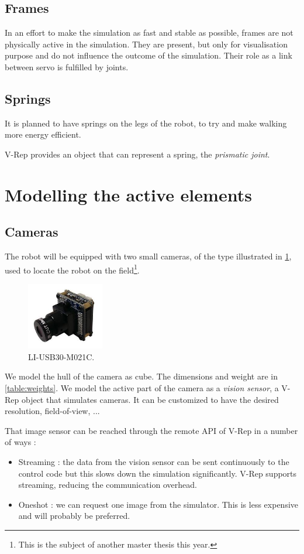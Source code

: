 \subsection{Frames}
In an effort to make the simulation as fast and stable as possible, frames are not physically active in the simulation. They are present, but only for visualisation purpose and do not influence the outcome of the simulation. Their role as a link between servo is fulfilled by joints.

\subsection{Springs}
It is planned to have springs on the legs of the robot, to try and make walking more energy efficient. 

V-Rep provides an object that can represent a spring, the \emph{prismatic joint}.

\section{Modelling the active elements}
\subsection{Cameras}
The robot will be equipped with two small cameras, of the type illustrated in \cref{fig:camera}, used to locate the robot on the field\footnote{This is the subject of another master thesis this year.}. 

\begin{figure}[htp]
\center
    \includegraphics[width = 0.3\textwidth]{figures/li_cam}
    \caption[LI-USB30-M021C]{LI-USB30-M021C.}
    \label{fig:camera}
\end{figure}

We model the hull of the camera as cube. The dimensions and weight are in \cref{table:weights}. We model the active part of the camera as a \emph{vision sensor}, a V-Rep object that simulates cameras. It can be customized to have the desired resolution, field-of-view, ...

That image sensor can be reached through the remote API of V-Rep in a number of ways : \begin{itemize}
\item Streaming : the data from the vision sensor can be sent continuously to the control code but this slows down the simulation significantly. V-Rep supports streaming, reducing the communication overhead.
\item Oneshot : we can request one image from the simulator. This is less expensive and will probably be preferred.
\end{itemize} 

